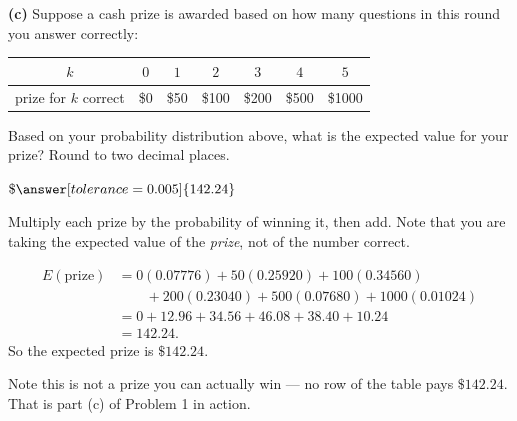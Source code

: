 \documentclass[12pt]{ximera}
\begin{document}
\begin{problem}
\begin{prompt}
\textbf{(c)} Suppose a cash prize is awarded based on how many questions in this
round you answer correctly:

\begin{center}
\begin{tabular}{|c|c|c|c|c|c|c|}\hline
$k$ & $0$ & $1$ & $2$ & $3$ & $4$ & $5$ \\\hline
prize for $k$ correct & \$0 & \$50 & \$100 & \$200 & \$500 & \$1000 \\\hline
\end{tabular}
\end{center}

Based on your probability distribution above, what is the expected value for your
prize? Round to two decimal places.

$\$\answer[tolerance=0.005]{142.24}$

\begin{hint}
Multiply each prize by the probability of winning it, then add. Note that you are
taking the expected value of the \emph{prize}, not of the number correct.
\end{hint}

\begin{feedback}
\begin{align*}
E(\text{prize}) &= 0(0.07776)+50(0.25920)+100(0.34560)\\
&\qquad +200(0.23040)+500(0.07680)+1000(0.01024)\\
&= 0 + 12.96 + 34.56 + 46.08 + 38.40 + 10.24\\
&= 142.24.
\end{align*}
So the expected prize is $\$142.24$.

Note this is not a prize you can actually win --- no row of the table pays
$\$142.24$. That is part (c) of Problem 1 in action.
\end{feedback}
\end{prompt}
\end{problem}
\end{document}
